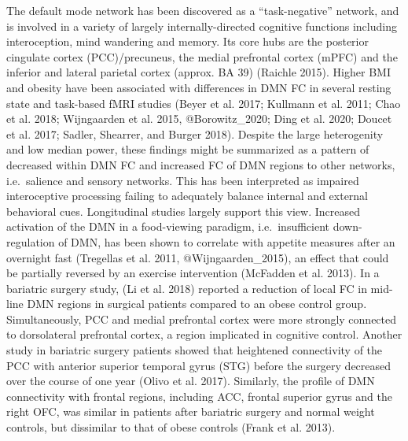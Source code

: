 \documentclass[
]{article}
\begin{document}
The default mode network has been discovered as a ``task-negative'' network, and is involved in a variety of largely internally-directed cognitive functions including interoception, mind wandering and memory. Its core hubs are the posterior cingulate cortex (PCC)/precuneus, the medial prefrontal cortex (mPFC) and the inferior and lateral parietal cortex (approx. BA 39) (Raichle 2015).
Higher BMI and obesity have been associated with differences in DMN FC in several resting state and task-based fMRI studies (Beyer et al. 2017; Kullmann et al. 2011; Chao et al. 2018; Wijngaarden et al. 2015, @Borowitz\_2020; Ding et al. 2020; Doucet et al. 2017; Sadler, Shearrer, and Burger 2018).
Despite the large heterogenity and low median power, these findings might be summarized as a pattern of decreased within DMN FC and increased FC of DMN regions to other networks, i.e.~salience and sensory networks. This has been interpreted as impaired interoceptive processing failing to adequately balance internal and external behavioral cues.
Longitudinal studies largely support this view. Increased activation of the DMN in a food-viewing paradigm, i.e.~insufficient down-regulation of DMN, has been shown to correlate with appetite measures after an overnight fast (Tregellas et al. 2011, @Wijngaarden\_2015), an effect that could be partially reversed by an exercise intervention (McFadden et al. 2013). In a bariatric surgery study, (Li et al. 2018) reported a reduction of local FC in mid-line DMN regions in surgical patients compared to an obese control group. Simultaneously, PCC and medial prefrontal cortex were more strongly connected to dorsolateral prefrontal cortex, a region implicated in cognitive control. Another study in bariatric surgery patients showed that heightened connectivity of the PCC with anterior superior temporal gyrus (STG) before the surgery decreased over the course of one year (Olivo et al. 2017). Similarly, the profile of DMN connectivity with frontal regions, including ACC, frontal superior gyrus and the right OFC, was similar in patients after bariatric surgery and normal weight controls, but dissimilar to that of obese controls (Frank et al. 2013).
\end{document}
